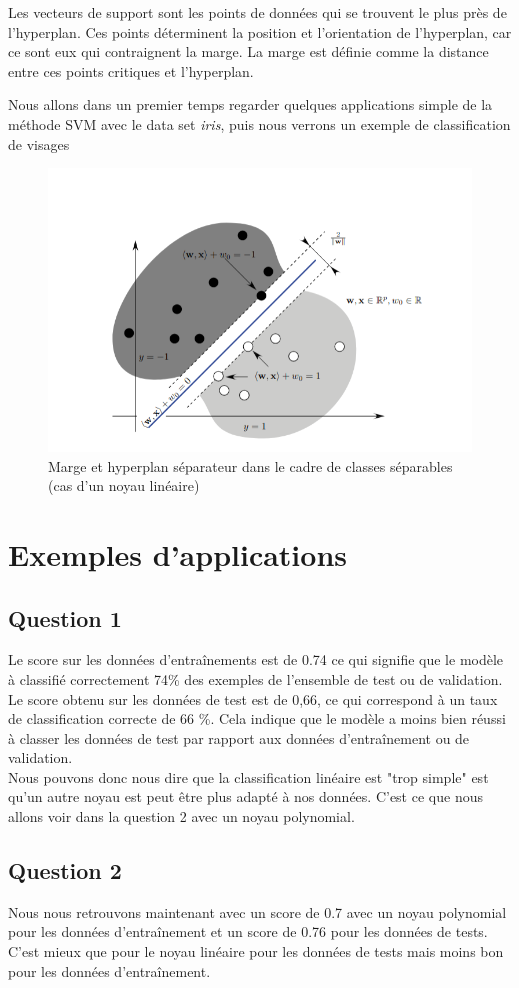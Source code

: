 \documentclass{article}
\begin{document}
Les vecteurs de support sont les points de données qui se trouvent le plus près de l'hyperplan. Ces points déterminent la position et l’orientation de l'hyperplan, car ce sont eux qui contraignent la marge. La marge est définie comme la distance entre ces points critiques et l'hyperplan.


Nous allons dans un premier temps regarder quelques applications simple de la méthode SVM avec le data set \textit{iris}, puis nous verrons un exemple de classification de visages 

\begin{figure}[H]
    \centering
    \includegraphics[width=0.5\linewidth]{SVM.png}
    \caption{ Marge et hyperplan séparateur dans le cadre de classes séparables (cas d’un noyau linéaire)}
    \label{fig1}
\end{figure}

\section{Exemples d'applications}
\subsection{Question 1}

Le score sur les données d'entraînements est de 0.74 ce qui signifie que le modèle à classifié correctement 74\% des exemples de l'ensemble de test ou de validation.\\
Le score obtenu sur les données de test est de 0,66, ce qui correspond à un taux de classification correcte de 66 \%. Cela indique que le modèle a moins bien réussi à classer les données de test par rapport aux données d'entraînement ou de validation.\\
Nous pouvons donc nous dire que la classification linéaire est "trop simple" est qu'un autre noyau est peut être plus adapté à nos données. C'est ce que nous allons voir dans la question 2 avec un noyau polynomial.
\subsection{Question 2}
Nous nous retrouvons maintenant avec un score de 0.7 avec un noyau polynomial pour les données d'entraînement et un score de 0.76 pour les données de tests. C'est mieux que pour le noyau linéaire pour les données de tests mais moins bon pour les données d'entraînement.
\end{document}
